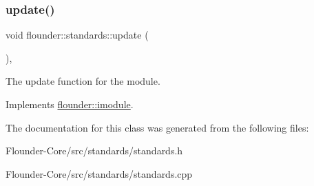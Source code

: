 \subsubsection{\texorpdfstring{update()}{update()}}
{\footnotesize\ttfamily void flounder\+::standards\+::update (\begin{DoxyParamCaption}{ }\end{DoxyParamCaption})\hspace{0.3cm}{\ttfamily [override]}, {\ttfamily [virtual]}}



The update function for the module. 



Implements \hyperlink{classflounder_1_1imodule_a9a53d48a46b5f6b16a92b2cd8503f74a}{flounder\+::imodule}.



The documentation for this class was generated from the following files\+:\begin{DoxyCompactItemize}
\item 
Flounder-\/\+Core/src/standards/standards.\+h\item 
Flounder-\/\+Core/src/standards/standards.\+cpp\end{DoxyCompactItemize}

